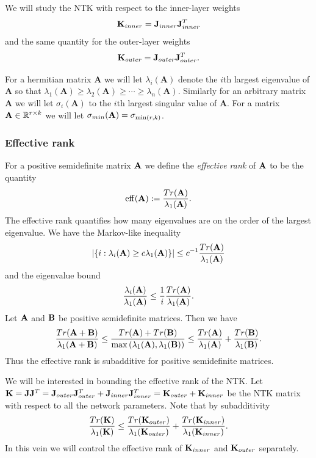 We will study the NTK with respect to the inner-layer weights
\[ \mathbf{K}_{inner} = \mathbf{J}_{inner} \mathbf{J}_{inner}^T \]
and the same quantity for the outer-layer weights
\[ \mathbf{K}_{outer} = \mathbf{J}_{outer} \mathbf{J}_{outer}^T. \]
\par
For a hermitian matrix $\mathbf{A}$ we will let $\lambda_i(\mathbf{A})$ denote the $i$th largest eigenvalue of $\mathbf{A}$ so that $\lambda_1(\mathbf{A}) \geq \lambda_2(\mathbf{A}) \geq \cdots \geq \lambda_n(\mathbf{A})$.  Similarly for an arbitrary matrix $\mathbf{A}$ we will let $\sigma_i(\mathbf{A})$ to the $i$th largest singular value of $\mathbf{A}$.  For a matrix $\mathbf{A} \in \mathbb{R}^{r \times k}$ we will let $\sigma_{min}(\mathbf{A}) = \sigma_{\min(r, k)}$.

\subsubsection{Effective rank}
For a positive semidefinite matrix $\mathbf{A}$ we define the \textit{effective rank} \citep{DBLP:journals/simods/HuangHV22} of $\mathbf{A}$ to be the quantity
\[ \mathrm{eff}(\mathbf{A}) :=  \frac{Tr(\mathbf{A})}{\lambda_1(\mathbf{A})}. \]
The effective rank quantifies how many eigenvalues are on the order of the largest eigenvalue.  We have the Markov-like inequality
\[ \left\lvert\{ i : \lambda_i(\mathbf{A}) \geq c \lambda_1(\mathbf{A})\}\right\rvert \leq c^{-1} \frac{Tr(\mathbf{A})}{\lambda_1(\mathbf{A})}\]
and the eigenvalue bound
\[ \frac{\lambda_i(\mathbf{A})}{\lambda_1(\mathbf{A})} \leq \frac{1}{i} \frac{Tr(\mathbf{A})}{\lambda_1(\mathbf{A})}. \]
Let $\mathbf{A}$ and $\mathbf{B}$ be positive semidefinite matrices.  Then we have
\begin{gather*}
\frac{Tr(\mathbf{A} + \mathbf{B})}{\lambda_1(\mathbf{A} + \mathbf{B})} \leq \frac{Tr(\mathbf{A}) + Tr(\mathbf{B})}{\max\left(\lambda_1(\mathbf{A}), \lambda_1(\mathbf{B})\right)} \leq \frac{Tr(\mathbf{A})}{\lambda_1(\mathbf{A})} + \frac{Tr(\mathbf{B})}{\lambda_1(\mathbf{B})}.
\end{gather*}
Thus the effective rank is subadditive for positive semidefinite matrices.
\par
We will be interested in bounding the effective rank of the NTK.  Let $\mathbf{K} = \mathbf{J} \mathbf{J}^T = \mathbf{J}_{outer} \mathbf{J}_{outer}^T + \mathbf{J}_{inner} \mathbf{J}_{inner}^T = \mathbf{K}_{outer} + \mathbf{K}_{inner}$ be the NTK matrix with respect to all the network parameters.  Note that by subadditivity
\[ \frac{Tr(\mathbf{K})}{\lambda_1(\mathbf{K})} \leq \frac{Tr(\mathbf{K}_{outer})}{\lambda_1(\mathbf{K}_{outer})} + \frac{Tr(\mathbf{K}_{inner})}{\lambda_1(\mathbf{K}_{inner})}. \]
In this vein we will control the effective rank of $\mathbf{K}_{inner}$ and $\mathbf{K}_{outer}$ separately.


